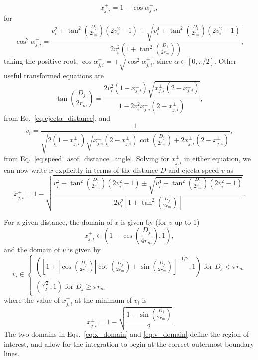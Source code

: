 \documentclass{hitec}
\numberwithin{equation}{section}
\begin{document}
\begin{equation}
x_{j,i}^{\pm} = 1 - \cos\alpha_{j,i}^{\pm},
\end{equation}
for
\begin{equation}
\cos^2\alpha_{j,i}^{\pm} = \frac{v_i^2+\tan^2\left(\frac{D_j}{2r_m}\right)(2v_i^2-1) \pm \sqrt{v_i^4 + \tan^2\left(\frac{D_j}{2r_m}\right)(2v_i^2-1)}}{2v_i^2\left(1 + \tan^2\left(\frac{D_j}{2r_m}\right)\right) },
\end{equation}
taking the positive root, $\cos\alpha_{j,i}^{\pm} = +\sqrt{\cos^2\alpha_{j,i}^{\pm}}$, since $\alpha\in [0, \pi/2]$. Other useful transformed equations are
\begin{equation}
\tan\left(\frac{D_j}{2r_m}\right) = \frac{2v_i^2(1-x_{j,i}^{\pm})\sqrt{x_{j,i}^{\pm}(2-x_{j,i}^{\pm})}}{1-2v_i^2x_{j,i}^{\pm}(2-x_{j,i}^{\pm})},
\end{equation}
from Eq.\ \eqref{eq:ejecta_distance}, and
\begin{equation}
v_i = \frac{1}{\sqrt{2(1-x_{j,i}^{\pm})\sqrt{x_{j,i}^{\pm}(2-x_{j,i}^{\pm})}\cot\left(\frac{D_j}{2r_m}\right) + 2x_{j,i}^{\pm}(2-x_{j,i}^{\pm})}},
\end{equation}
from Eq.\ \eqref{eq:speed_asof_distance_angle}. Solving for $x_{j,i}^{\pm}$ in either equation, we can now write $x$ explicitly in terms of the distance $D$ and ejecta speed $v$ as
\begin{equation}
x_{j,i}^{\pm} = 1 - \sqrt{\frac{v_i^2 + \tan^2\left(\frac{D_j}{2r_m}\right)(2v_i^2-1) \pm \sqrt{v_i^4 + \tan^2\left(\frac{D_j}{2r_m}\right)(2v_i^2-1)}}{2v_i^2\left[1+\tan^2\left(\frac{D_j}{2r_m}\right)\right]}}.
\end{equation}

For a given distance, the domain of $x$ is given by (for $v$ up to 1)
\begin{equation}\label{eq:x_domain} %
x_{j,i}^{\pm} \in \left(1 - \cos\left(\frac{D_j}{4r_m}\right),
1 \right),
\end{equation}
and the domain of $v$ is given by
\begin{equation}\label{eq:v_domain}
v_i \in
\begin{cases}
\left(\left[1 + \left|\cos\left(\frac{D_j}{2r_m}\right)\right|\cot\left(\frac{D_j}{2r_m}\right) + \sin\left(\frac{D_j}{2r_m}\right) \right]^{-1/2}, 1\right) \text{  for $D_j < \pi r_m$}\\
\left(\frac{\sqrt{2}}{2}, 1\right) \text{  for $D_j \ge \pi r_m$}
\end{cases}
\end{equation}
where the value of $x_{j,i}^{\pm}$ at the minimum of $v_i$ is
\begin{equation}
x_{j,i}^{\pm} = 1-\sqrt{\frac{1-\sin\left(\frac{D_j}{2r_m}\right)}{2}}
\end{equation}
The two domains in Eqs.\ \eqref{eq:x_domain} and \eqref{eq:v_domain} define the region of interest, and allow for the integration to begin at the correct outermost boundary lines.
\end{document}
